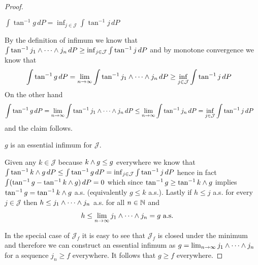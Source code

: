 \begin{proof}
\begin{clm} $\int \tan^{-1} g \, dP =\inf_{j \in \mathcal{J}} \int \tan^{-1} j \, dP$
\end{clm}
By the definition of infimum we know that
$\int \tan^{-1}  j_1 \wedge \dotsb \wedge j_n \, dP \geq \inf_{j \in \mathcal{J}} \int \tan^{-1} j \, dP$ and by monotone convergence we know that 
\begin{align*}
\int \tan^{-1} g \, dP &= \lim_{n \to \infty} \int \tan^{-1}  j_1 \wedge \dotsb \wedge j_n \, dP \geq \inf_{j \in \mathcal{J}} \int \tan^{-1} j \, dP
\end{align*}
On the other hand 
\begin{align*}
\int \tan^{-1} g \, dP &= \lim_{n \to \infty} \int \tan^{-1}  j_1 \wedge \dotsb \wedge j_n \, dP \leq \lim_{n \to \infty} \int \tan^{-1}  j_n \, dP 
= \inf_{j \in \mathcal{J}} \int \tan^{-1} j \, dP
\end{align*}
and the claim follows.

\begin{clm} $g$ is an essential infimum for $\mathcal{J}$.
\end{clm}
Given any $k \in \mathcal{J}$ because $k \wedge g \leq g$ everywhere we know that $\int \tan^{-1} k \wedge g \, dP \leq \int  \tan^{-1} g \, dP = \inf_{j \in \mathcal{J}} \int \tan^{-1} j \, dP$ hence in fact
 $\int (\tan^{-1} g - \tan^{-1} k \wedge g) \, dP = 0$ which since $\tan^{-1} g \geq \tan^{-1} k \wedge g$ implies $\tan^{-1} g = \tan^{-1} k \wedge g$ a.s. (equivalently $g \leq k$ a.s.).  Lastly if $h \leq j$ a.s. for every $j \in \mathcal{J}$ then $h \leq j_1 \wedge \dotsb \wedge j_n$ a.s. for all $n \in \mathbb{N}$ and
\begin{align*}
h &\leq \lim_{n \to \infty} j_1 \wedge \dotsb \wedge j_n = g \text{ a.s. }
\end{align*}

In the special case of $\mathcal{J}_f$ it is easy to see that $\mathcal{J}_f$ is closed under the minimum and therefore we can construct an essential infimum as $g=\lim_{n \to \infty} j_1 \wedge \dotsb \wedge j_n$ for a sequence $j_n \geq f$ everywhere.  It follows that $g \geq f$ everywhere.


\end{proof}
